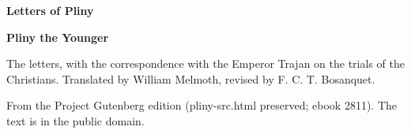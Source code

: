 \documentclass[11pt,letterpaper]{article}
\begin{document}
\color{ink}

\begin{titlepage}
\centering
\vspace*{4em}
{\LARGE\bfseries\color{heading} Letters of Pliny\par}
\vspace{2em}
{\Large\bfseries\color{heading} Pliny the Younger\par}
\vspace{2.5em}
{\itshape\color{subhead}\parbox{0.8\linewidth}{\centering The letters, with the correspondence with the Emperor Trajan on the trials of the Christians. Translated by William Melmoth, revised by F. C. T. Bosanquet.\par}}
\vfill
{\small From the Project Gutenberg edition (pliny-src.html preserved; ebook 2811). The text is in the public domain.\par}
\vspace{2em}
\end{titlepage}

\tableofcontents


\end{document}
